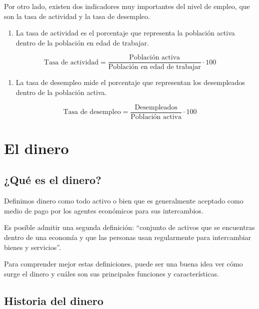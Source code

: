 \documentclass[
]{krantz}
\providecommand{\tightlist}{%
  \setlength{\itemsep}{0pt}\setlength{\parskip}{0pt}}
\begin{document}
Por otro lado, existen dos indicadores muy importantes del nivel de empleo, que son la tasa de actividad y la tasa de desempleo.

\begin{enumerate}
\def\labelenumi{\alph{enumi})}
\tightlist
\item
  La tasa de actividad es el porcentaje que representa la población activa dentro de la población en edad de trabajar.
\end{enumerate}

\[\mathrm {\text{Tasa de actividad} = \frac{\text{Población activa}}{\text{Población en edad de trabajar}}·100}\]

\begin{enumerate}
\def\labelenumi{\alph{enumi})}
\setcounter{enumi}{1}
\tightlist
\item
  La tasa de desempleo mide el porcentaje que representan los desempleados dentro de la población activa.
\end{enumerate}

\[\mathrm {\text{Tasa de desempleo} = \frac{\text{Desempleados}}{\text{Población activa}}·100}\]

\hypertarget{el-dinero}{%
\chapter{El dinero}\label{el-dinero}}

\hypertarget{quuxe9-es-el-dinero}{%
\section{¿Qué es el dinero?}\label{quuxe9-es-el-dinero}}

Definimos dinero como todo activo o bien que es generalmente aceptado como medio de pago por los agentes económicos para sus intercambios.

Es posible admitir una segunda definición: ``conjunto de activos que se encuentras dentro de una economía y que las personas usan regularmente para intercambiar bienes y servicios''.

Para comprender mejor estas definiciones, puede ser una buena idea ver cómo surge el dinero y cuáles son sus principales funciones y características.

\hypertarget{historia-del-dinero}{%
\section{Historia del dinero}\label{historia-del-dinero}}
\end{document}
